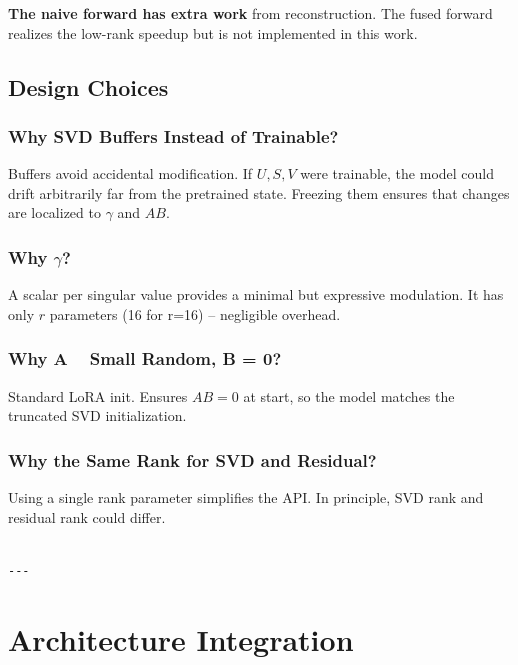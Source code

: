 \textbf{The naive forward has extra work} from reconstruction. The fused forward 
realizes the low-rank speedup but is not implemented in this work.

\subsection{Design Choices}

\subsubsection{Why SVD Buffers Instead of Trainable?}

Buffers avoid accidental modification. If $U, S, V$ were trainable, the model 
could drift arbitrarily far from the pretrained state. Freezing them ensures 
that changes are localized to $\gamma$ and $AB$.

\subsubsection{Why $\gamma$?}

A scalar per singular value provides a minimal but expressive modulation. 
It has only $r$ parameters (16 for r=16) -- negligible overhead.

\subsubsection{Why A ~ Small Random, B = 0?}

Standard LoRA init. Ensures $AB = 0$ at start, so the model matches the 
truncated SVD initialization.

\subsubsection{Why the Same Rank for SVD and Residual?}

Using a single rank parameter simplifies the API. In principle, SVD rank and 
residual rank could differ.
\begin{lstlisting}

---
\end{lstlisting}


\section{Architecture Integration}


